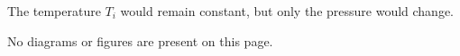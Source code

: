 The temperature \( T_i \) would remain constant, but only the pressure would change.  

No diagrams or figures are present on this page.